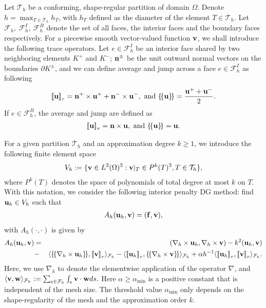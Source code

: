 \documentclass[final,leqno]{siamltex704}
\newcommand{\bn}{{\bf n}}
\newcommand{\bv}{{\bf v}}
\def\bbf{{\bf f}}
\def\bn{{\bf n}}
\def\bu{{\bf u}}
\def\bv{{\bf v}}
\def\bw{{\bf w}}
\def\ljump{{[\![}}
\def\rjump{{]\!]}}
\def\lavg{{\{\!\{}}
\def\ravg{{\}\!\}}}
\begin{document}
\vspace{5pt}
Let $\mathcal{T}_h$ be a conforming, shape-regular partition of domain $\Omega$. Denote $h=\max_{T\in\mathcal{T}_h}h_T$, with $h_T$ defined as the diameter of the element $T\in\mathcal{T}_h$. Let $\mathcal{F}_h,\ \mathcal{F}_h^I,\ \mathcal{F}_h^B$ denote the set of all faces, the interior faces and the boundary faces respectively. 
For a piecewise smooth vector-valued function $\bv$, we shall introduce the following trace operators. Let $e\in\mathcal{F}_h^I$ be an interior face shared by two neighboring elements $K^+$ and $K^-$; $\bn^\pm$ be the unit outward normal vectors on the boundaries $\partial K^\pm$, and we can define average and jump across a face $e\in\mathcal{F}_h^I$ as following
\begin{eqnarray*}
\ljump \bu \rjump_{\tau}={\bf n}^+\times\bu^++{\bf n}^-\times\bu^-,\mbox{ and }\lavg \bu\ravg=\frac{\bu^++\bu^-}{2}.
\end{eqnarray*}
If $e\in\mathcal{F}_h^B$, the average and jump are defined as
\begin{eqnarray*}
\ljump \bu \rjump_{\tau}={\bf n}\times\bu,\mbox{ and } \lavg\bu\ravg=\bu.
\end{eqnarray*}


For a given partition $\mathcal{T}_h$ and an approximation degree $k\ge 1$, we introduce the following finite element space
\begin{eqnarray}
V_h:=\{\bv\in L^2(\Omega)^3:\bv|_T\in P^k(T)^3,T\in\mathcal{T}_h\},
\end{eqnarray}
where $P^k(T)$ denotes the space of polynomials of total degree at most $k$ on $T$. With this notation, we consider the following interior penalty DG method: find $\bu_h\in V_h$ such that
\begin{eqnarray}
A_h(\bu_h,\bv)=(\bbf,\bv),
\end{eqnarray}
with $A_h(\cdot,\cdot)$ is given by
\begin{eqnarray}
A_h(\bu_h,\bv)&=&(\nabla_h\times \bu_h,\nabla_h\times \bv)-k^2(\bu_h,\bv)\notag\\
&-&\langle\lavg\nabla_h\times \bu_h\ravg,\ljump \bv\rjump_{\tau}\rangle_{\mathcal{F}_h}-\langle\ljump \bu_h\rjump_{\tau},\lavg\nabla_h\times \bv\ravg\rangle_{\mathcal{F}_h}
+\alpha h^{-1}\langle\ljump \bu_h\rjump_{\tau},\ljump \bv\rjump_{\tau}\rangle_{\mathcal{F}_h}.
\end{eqnarray}
Here, we use $\nabla_h$ to denote the elementwise application of the operator $\nabla$, and $\langle \bv, \bw\rangle_{\mathcal{F}_h}:=\sum_{e\in\mathcal{F}_h}\int_e \bv\cdot\bw ds.$
Here $\alpha\ge \alpha_{\min}$ is a positive constant that is independent of the mesh size. The threshold value $\alpha_{\min}$ only depends on the shape-regularity of the mesh and the approximation order $k$.
\end{document}
